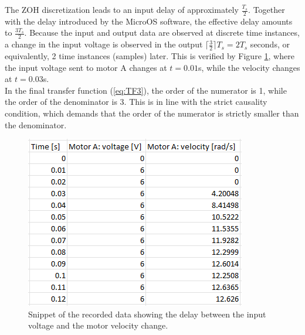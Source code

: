 \documentclass[a4paper,kul]{kulakarticle} %
\begin{document}
The ZOH discretization leads to an input delay of approximately $\frac{T_s}{2}$. Together with the delay introduced by the MicroOS software, the effective delay amounts to $\frac{3T_s}{2}$. Because the input and output data are observed at discrete time instances, a change in the input voltage is observed in the output $\lceil \frac{3}{2} \rceil T_s = 2T_s$ seconds, or equivalently, 2 time instances (samples) later. This is verified by Figure \ref{fig:delay}, where the input voltage sent to motor A changes at $t = 0.01$s, while the velocity changes at $t = 0.03$s. \\
\noindent In the final transfer function (\ref{eq:TF3}), the order of the numerator is 1, while the order of the denominator is 3. This is in line with the strict causality condition, which demands that the order of the numerator is strictly smaller than the denominator. 

\begin{figure}
	\centering
	\includegraphics[width=.5\linewidth]{delay.png}
	\caption[Data snippet]{Snippet of the recorded data showing the delay between the input voltage and the motor velocity change.}
	\label{fig:delay}
\end{figure}


\end{document}
